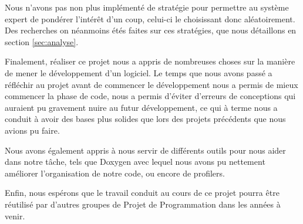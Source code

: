 \documentclass[a4paper]{report}
\begin{document}
Nous n'avons pas non plus implémenté de stratégie pour permettre au système expert de pondérer l’intérêt d'un coup, celui-ci le choisissant donc aléatoirement. Des recherches on néanmoins étés faites sur ces stratégies, que nous détaillons en section \ref{sec:analyse}.

Finalement, réaliser ce projet nous a appris de nombreuses choses sur la manière de mener le développement d'un logiciel. Le temps que nous avons passé a réfléchir au projet avant de commencer le développement nous a permis de mieux commencer la phase de code, nous a permis d'éviter d'erreurs de conceptions qui auraient pu gravement nuire au futur développement, ce qui à terme nous a conduit à avoir des bases plus solides que lors des projets précédents que nous avions pu faire.

Nous avons également appris à nous servir de différents outils pour nous aider dans notre tâche, tels que Doxygen avec lequel nous avons pu nettement améliorer l'organisation de notre code, ou encore de profilers.

Enfin, nous espérons que le travail conduit au cours de ce projet pourra être réutilisé par d'autres groupes de Projet de Programmation dans les années à venir.

%
%
\nocite{*}
\printbibliography[
heading=bibintoc,
title={Bibliographie}
]



\setlength{\parskip}{0.0em}
\listoffigures
\setlength{\parskip}{0.5em}

\appendix
\end{document}
